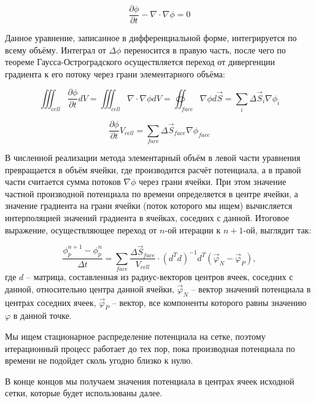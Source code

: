 \documentclass[a4paper,12pt]{article}
\begin{document}
\begin{equation}
    \frac{\partial \phi}{\partial t} - \nabla \cdot \nabla \phi = 0
\end{equation}

Данное уравнение, записанное в дифференциальной форме, интегрируется по всему объёму. Интеграл от $\Delta \phi$ переносится в правую часть, после чего по теореме Гаусса-Остроградского осуществляется переход от дивергенции градиента к его потоку через грани элементарного объёма:

\begin{equation}
    \iiint_{cell} \frac{\partial \phi}{\partial t} dV = \iiint_{cell} \nabla \cdot \nabla \phi dV = \oiint_{face} \nabla \phi d \vec S = \sum_i \Delta \vec S_i \nabla \phi_i
\end{equation}

\begin{equation}
    \frac{\partial \phi}{\partial t} V_{cell} = \sum_{face} \Delta \vec S_{face} \nabla \phi_{face}
\end{equation}

В численной реализации метода элементарный объём в левой части уравнения превращается в объём ячейки, где производится расчёт потенциала, а в правой части считается сумма потоков $\nabla \phi$ через грани ячейки. При этом значение частной производной потенциала по времени определяется в центре ячейки, а значение градиента на грани ячейки (поток которого мы ищем) вычисляется интерполяцией значений градиента в ячейках, соседних с данной.
Итоговое выражение, осуществляющее переход от $n$-ой итерации к $n+1$-ой, выглядит так:

\begin{equation}
    \frac{\phi_{p}^{n+1} - \phi_{p}^{n}}{\Delta t} = \sum_{face} \frac{\Delta \vec S_{face}}{V_{cell}} \cdot (d^T d)^{-1} d^T (\vec{\varphi}_N - \vec{\varphi}_P),
\end{equation}
где $d$ -- матрица, составленная из радиус-векторов центров ячеек, соседних с данной, относительно центра данной ячейки, $\vec{\varphi}_N$ -- вектор значений потенциала в центрах соседних ячеек, $\vec{\varphi}_P$ -- вектор, все компоненты которого равны значению $\varphi$ в данной точке.

Мы ищем стационарное распределение потенциала на сетке, поэтому итерационный процесс работает до тех пор, пока производная потенциала по времени не подойдет сколь угодно близко к нулю.

В конце концов мы получаем значения потенциала в центрах ячеек исходной сетки, которые будет использованы далее.
\end{document}

